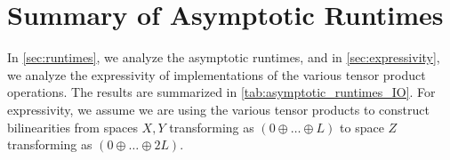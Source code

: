 \documentclass{article}
\theoremstyle{definition}
\newtheorem{proposition}[theorem]{Proposition}
\theoremstyle{remark}
\begin{document}






\section{Summary of Asymptotic Runtimes}
\label{sec:asymptotics}


In \autoref{sec:runtimes}, we analyze the asymptotic runtimes, and in \autoref{sec:expressivity}, we analyze the expressivity of implementations of the various tensor product operations. The results are summarized in \autoref{tab:asymptotic_runtimes_IO}. For expressivity, we assume we are using the various tensor products to construct bilinearities from spaces $X, Y$ transforming as $(0\oplus\ldots\oplus L)$ to space $Z$ transforming as $(0\oplus\ldots\oplus 2L)$.
\end{document}
